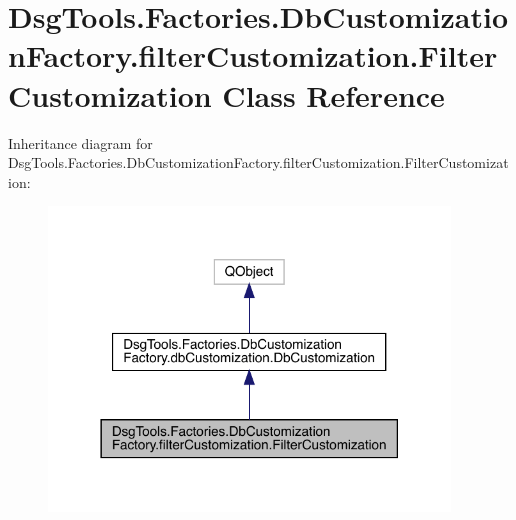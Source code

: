 \hypertarget{class_dsg_tools_1_1_factories_1_1_db_customization_factory_1_1filter_customization_1_1_filter_customization}{}\section{Dsg\+Tools.\+Factories.\+Db\+Customization\+Factory.\+filter\+Customization.\+Filter\+Customization Class Reference}
\label{class_dsg_tools_1_1_factories_1_1_db_customization_factory_1_1filter_customization_1_1_filter_customization}


Inheritance diagram for Dsg\+Tools.\+Factories.\+Db\+Customization\+Factory.\+filter\+Customization.\+Filter\+Customization\+:
\nopagebreak
\begin{figure}[H]
\begin{center}
\leavevmode
\includegraphics[width=302pt]{class_dsg_tools_1_1_factories_1_1_db_customization_factory_1_1filter_customization_1_1_filter_customization__inherit__graph}
\end{center}
\end{figure}


